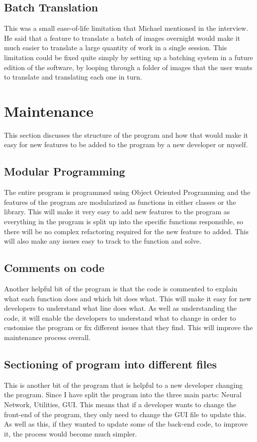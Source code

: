 \documentclass{report}
\begin{document}
\subsection{Batch Translation}
This was a small ease-of-life limitation that Michael mentioned in the interview. He said that a feature to translate a batch of images overnight would make it much easier to translate a large quantity of work in a single session.
\newline
This limitation could be fixed quite simply by setting up a batching system in a future edition of the software, by looping through a folder of images that the user wants to translate and translating each one in turn.
\newpage
\section{Maintenance}
This section discusses the structure of the program and how that would make it easy for new features to be added to the program by a new developer or myself.
\subsection{Modular Programming}
The entire program is programmed using Object Oriented Programming and the features of the program are modularized as functions in either classes or the library. This will make it very easy to add new features to the program as everything in the program is split up into the specific functions responsible, so there will be no complex refactoring required for the new feature to added. This will also make any issues easy to track to the function and solve.
\subsection{Comments on code}
Another helpful bit of the program is that the code is commented to explain what each function does and which bit does what. This will make it easy for new developers to understand what line does what. As well as understanding the code, it will enable the developers to understand what to change in order to customise the program or fix different issues that they find. This will improve the maintenance process overall.
\subsection{Sectioning of program into different files}
This is another bit of the program that is helpful to a new developer changing the program. Since I have split the program into the three main parts: Neural Network, Utilities, GUI. This means that if a developer wants to change the front-end of the program, they only need to change the GUI file to update this. As well as this, if they wanted to update some of the back-end code, to improve it, the process would become much simpler.
\newpage
\end{document}

